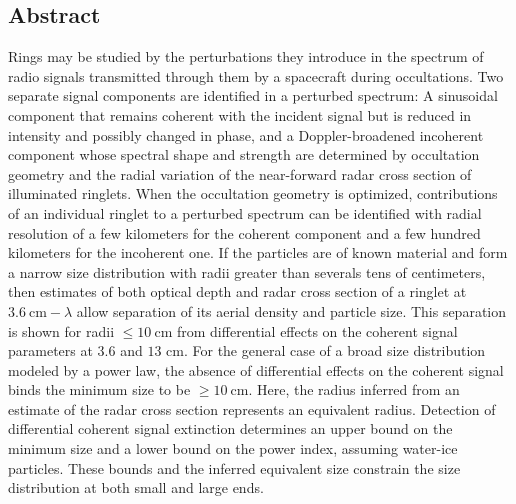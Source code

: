\documentclass[oneside]{book}
\theoremstyle{mystyle}
\begin{document}
\subsection{Abstract}
\noindent Rings may be studied by the perturbations they introduce in the spectrum of radio signals transmitted through them by a spacecraft during occultations. Two separate signal components are identified in a perturbed spectrum: A sinusoidal component that remains coherent with the incident signal but is reduced in intensity and possibly changed in phase, and a Doppler-broadened incoherent component whose spectral shape and strength are determined by occultation geometry and the radial variation of the near-forward radar cross section of illuminated ringlets. When the occultation geometry is optimized, contributions of an individual ringlet to a perturbed spectrum can be identified with radial resolution of a few kilometers for the coherent component and a few hundred kilometers for the incoherent one. If the particles are of known material and form a narrow size distribution with radii greater than severals tens of centimeters, then estimates of both optical depth and radar cross section of a ringlet at $3.6\ \textrm{cm}-\lambda$ allow separation of its aerial density and particle size. This separation is shown for radii $\leq 10\ \textrm{cm}$ from differential effects on the coherent signal parameters at $3.6$ and $13$ cm. For the general case of a broad size distribution modeled by a power law, the absence of differential effects on the coherent signal binds the minimum size to be $\geq 10\ \textrm{cm}$. Here, the radius inferred from an estimate of the radar cross section represents an equivalent radius. Detection of differential coherent signal extinction determines an upper bound on the minimum size and a lower bound on the power index, assuming water-ice particles. These bounds and the inferred equivalent size constrain the size distribution at both small and large ends.
\end{document}
